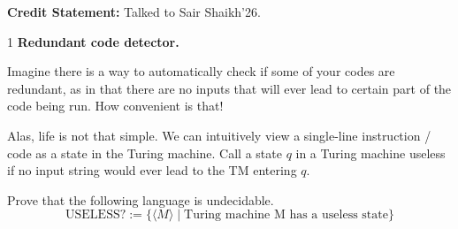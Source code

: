 \documentclass[12pt]{article}
\begin{document}


\textbf{Credit Statement: }Talked to Sair Shaikh'26.

\begin{problem}{1}
    \textbf{Redundant code detector.} 
    
    Imagine there is a way to automatically check if some of your codes are redundant, as in that there are no inputs that will ever lead to certain part of the code being run. How convenient is that!
    
    Alas, life is not that simple. We can intuitively view a single-line instruction / code as a state in the Turing machine. Call a state $q$ in a Turing machine useless if no input string would ever lead to the TM entering $q$.
    
    Prove that the following language is undecidable.
    \[\text{USELESS?} := \{\langle M \rangle \mid \text{Turing machine M has a useless state}\}\]
\end{problem}
\end{document}
